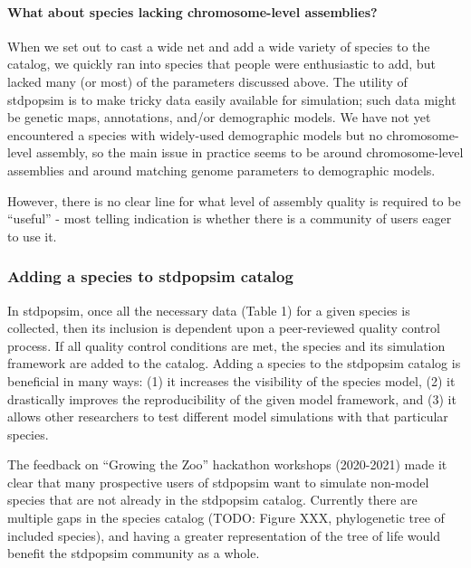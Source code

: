 \documentclass[hidelinks]{article}
\begin{document}
\hypertarget{what-about-species-lacking-chromosome-level-assemblies}{%
\paragraph{What about species lacking chromosome-level
assemblies?}\label{what-about-species-lacking-chromosome-level-assemblies}}

When we set out to cast a wide net and add a wide variety of species to
the catalog, we quickly ran into species that people were enthusiastic
to add, but lacked many (or most) of the parameters discussed above. The
utility of stdpopsim is to make tricky data easily available for
simulation; such data might be genetic maps, annotations, and/or
demographic models. We have not yet encountered a species with
widely-used demographic models but no chromosome-level assembly, so the
main issue in practice seems to be around chromosome-level assemblies
and around matching genome parameters to demographic models.

However, there is no clear line for what level of assembly quality is
required to be ``useful'' - most telling indication is whether there is
a community of users eager to use it.

\hypertarget{adding-a-species-to-stdpopsim-catalog}{%
\subsubsection*{Adding a species to stdpopsim
catalog}\label{adding-a-species-to-stdpopsim-catalog}}

In stdpopsim, once all the necessary data (Table 1) for a given species
is collected, then its inclusion is dependent upon a peer-reviewed
quality control process. If all quality control conditions are met, the
species and its simulation framework are added to the catalog. Adding a
species to the stdpopsim catalog is beneficial in many ways: (1) it
increases the visibility of the species model, (2) it drastically
improves the reproducibility of the given model framework, and (3) it
allows other researchers to test different model simulations with that
particular species.

The feedback on ``Growing the Zoo'' hackathon workshops (2020-2021) made
it clear that many prospective users of stdpopsim want to simulate
non-model species that are not already in the stdpopsim catalog.
Currently there are multiple gaps in the species catalog (TODO: Figure
XXX, phylogenetic tree of included species), and having a greater
representation of the tree of life would benefit the stdpopsim community
as a whole.
\end{document}
